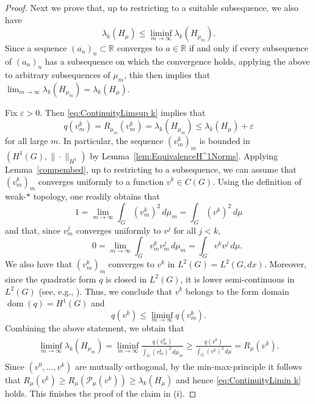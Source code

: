 \documentclass[reqno]{amsart}
\theoremstyle{plain}
\theoremstyle{definition}
\theoremstyle{remark}
\numberwithin{equation}{section}
\newcommand{\R}{\mathbb{R}}     %
\newcommand{\cP}{\mathcal{P}}   %
\newcommand{\dom}{\operatorname{dom}}
\begin{document}
\begin{proof}
	Next we prove that, up to restricting to a suitable subsequence, we also have
	\begin{equation} \label{eq:ContinuityLimin k}
		\lambda_k(H_\mu) \le \liminf_{m \to \infty} \lambda_k(H_{\mu_m}).
	\end{equation}
	Since a sequence $(a_n)_n \subset \R$ converges to $a \in \R$ if and only if every subsequence of $(a_n)_n$ has a subsequence on which the convergence holds, applying the above to arbitrary subsequences of $\mu_m$, this then implies that $\lim_{m \to \infty} \lambda_k(H_{\mu_m}) = \lambda_k(H_{\mu})$.
	
	Fix $\varepsilon>0$. Then \eqref{eq:ContinuityLimsup k} implies that
	\[
	q(v_{m}^k)=R_{\mu_m}(v_{m}^k) = \lambda_k(H_{\mu_{m}}) \le \lambda_k(H_\mu) + \varepsilon
	\]
	for all large $m$. In particular, the sequence $(v_{m}^k)_m$ is bounded in $(H^1(G), \|\cdot\|_{H^1})$ by Lemma~\ref{lem:EquivalenceH^1Norms}. Applying Lemma~\ref{compembed}, up to restricting to a subsequence, we can assume that $(v_m^k)_m$ converges uniformly to a function $v^k \in C(G)$.
	Using the definition of weak-$\ast$ topology, one readily obtains that
	\[
	1 = \lim_{m \to \infty} \int_G \left(v_{m}^k\right)^2 \, d\mu_m = \int_G \left(v^k\right)^2 \, d\mu
	\]
	and that, since $v_{m}^j$ converges uniformly to $v^j$ for all $j<k$,
	\[
	\qquad 0 = \lim_{m \to \infty} \int_G v_{m}^kv_{m}^j \, d\mu_m = \int_Gv^k v^j \, d\mu.
	\]
	We also have that $(v_m^k)_m$ converges to $v^k$ in $L^2(G) =L^2(G,dx)$. Moreover, since the quadratic form $q$ is closed in $L^2(G)$, it is lower semi-continuous in $L^2(G)$ (see, e.g., \cite[Theorem 1.2.1]{dav89}). Thus, we conclude that $v^k$ belongs to the form domain $\dom(q) = H^1(G)$ and
	\[
	q(v^k) \le \liminf_{m \to \infty} q(v_{m}^k).
	\]
	Combining the above statement, we obtain that
	\begin{align} \begin{split}
			\label{eq: proof continuity of eigenvalues}
			\liminf_{m \to \infty} \lambda_k(H_{\mu_m}) =  \liminf_{m \to \infty} \frac{q(v_{m}^k)}{\int_G \left(v_{m}^k\right)^2 \, d\mu_m}
			\ge \frac{q(v^k)}{\int_G \left(v^k\right)^2 \, d\mu} = R_\mu(v^k).
		\end{split}
	\end{align}
	Since $(v^0,\dots, v^k)$ are mutually orthogonal, by the min-max-principle it follows that $R_\mu(v^k) \geq R_\mu( \cP_\mu(v^k))  \geq \lambda_k(H_\mu)$ and hence \eqref{eq:ContinuityLimin k} holds. This finishes the proof of the claim in (i).
	

\end{proof}
\end{document}
